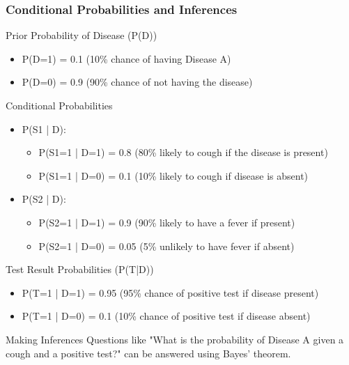 \documentclass[aspectratio=169]{beamer}
\begin{document}
\begin{frame}[fragile]
  \frametitle{Conditional Probabilities and Inferences}
  \begin{block}{Prior Probability of Disease (P(D))}
    \begin{itemize}
      \item P(D=1) = 0.1 (10\% chance of having Disease A)
      \item P(D=0) = 0.9 (90\% chance of not having the disease)
    \end{itemize}
  \end{block}

  \begin{block}{Conditional Probabilities}
    \begin{itemize}
      \item P(S1 | D): 
        \begin{itemize}
          \item P(S1=1 | D=1) = 0.8 (80\% likely to cough if the disease is present)
          \item P(S1=1 | D=0) = 0.1 (10\% likely to cough if disease is absent)
        \end{itemize}
      \item P(S2 | D): 
        \begin{itemize}
          \item P(S2=1 | D=1) = 0.9 (90\% likely to have a fever if present)
          \item P(S2=1 | D=0) = 0.05 (5\% unlikely to have fever if absent)
        \end{itemize}
    \end{itemize}
  \end{block}

  \begin{block}{Test Result Probabilities (P(T|D))}
    \begin{itemize}
      \item P(T=1 | D=1) = 0.95 (95\% chance of positive test if disease present)
      \item P(T=1 | D=0) = 0.1 (10\% chance of positive test if disease absent)
    \end{itemize}
  \end{block}

  \begin{block}{Making Inferences}
    Questions like "What is the probability of Disease A given a cough and a positive test?" can be answered using Bayes' theorem.
  \end{block}
\end{frame}
\end{document}
